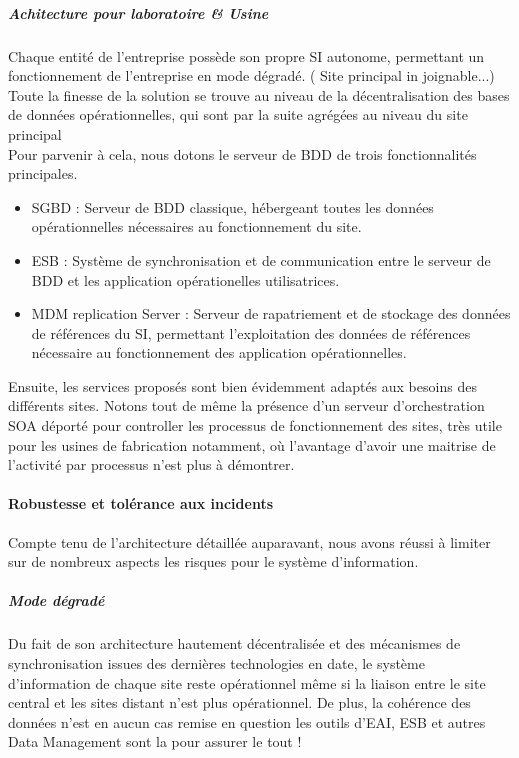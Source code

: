 \subparagraph{Achitecture pour laboratoire \& Usine}

Chaque entité de l'entreprise possède son propre SI autonome, permettant un fonctionnement de l'entreprise en mode dégradé. ( Site principal in joignable...)
Toute la finesse de la solution se trouve au niveau de la décentralisation des bases de données opérationnelles, qui sont par la suite agrégées au niveau du site principal \\
Pour parvenir  à cela, nous dotons le serveur de BDD de trois fonctionnalités principales.
\begin{itemize}
\item SGBD : Serveur de BDD classique, hébergeant toutes les données opérationnelles nécessaires au fonctionnement du site.
\item ESB : Système de synchronisation et de communication entre le serveur de BDD et les application opérationelles utilisatrices.
\item MDM replication Server :  Serveur de rapatriement et de stockage des données de références du SI, permettant l'exploitation des données de références nécessaire au fonctionnement des application opérationnelles.
\end{itemize}

Ensuite, les services proposés sont bien évidemment adaptés aux besoins des différents sites. Notons tout de même la présence d'un serveur d'orchestration SOA déporté pour controller les processus de fonctionnement des sites, très utile pour les usines de fabrication notamment, où l'avantage d'avoir une maitrise de l'activité par processus n'est plus à démontrer.

\paragraph{Robustesse et tolérance aux incidents}

Compte tenu de l'architecture détaillée auparavant, nous avons réussi à limiter sur de nombreux aspects les risques pour le système d'information.\\
\subparagraph{Mode dégradé}

Du fait de son architecture hautement décentralisée et des mécanismes de synchronisation issues des dernières technologies en date, le système d'information de chaque site reste opérationnel même si la liaison entre le site central et les sites distant n'est plus opérationnel. De plus, la cohérence des données n'est en aucun cas remise en question les outils d'EAI, ESB et autres Data Management sont la pour assurer le tout !

